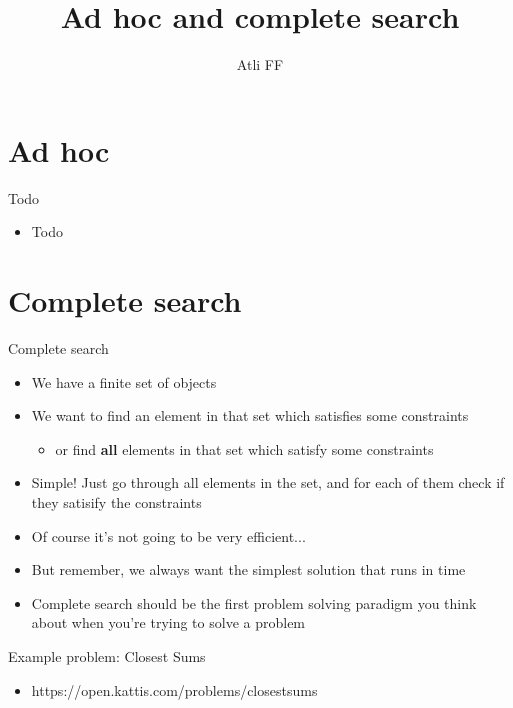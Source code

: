 \documentclass{beamer}
\title{Ad hoc and complete search}
\author{Atli FF}
\institute{\href{http://ru.is/td}{School of Computer Science} \\[2pt] \href{http://ru.is}{Reykjavík University}}
\begin{document}
\maketitle

\section*{Ad hoc}

\begin{frame}[plain]{Todo}
    \begin{itemize}
        \item Todo
    \end{itemize}
\end{frame}

\section*{Complete search}

\begin{frame}[plain]{Complete search}
    \begin{itemize}
        \item We have a finite set of objects
        \item We want to find an element in that set which satisfies some constraints
        \begin{itemize}
            \item or find \textbf{all} elements in that set which satisfy some constraints
        \end{itemize}

        \vspace{5pt}
        \item Simple! Just go through all elements in the set, and for each of them check if they satisify the constraints
        \item Of course it's not going to be very efficient...
        \item But remember, we always want the simplest solution that runs in time
        \item Complete search should be the first problem solving paradigm you think about when you're trying to solve a problem
    \end{itemize}
\end{frame}

\begin{frame}[plain]{Example problem: Closest Sums}
    \begin{itemize}
        \item https://open.kattis.com/problems/closestsums
    \end{itemize}
\end{frame}
\end{document}
